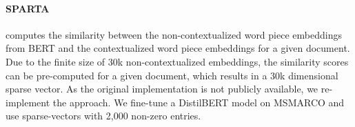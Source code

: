 \documentclass[11pt]{article}
\newcommand{\ra}[1]{\renewcommand{\arraystretch}{#1}}
\begin{document}
\paragraph{\textbf{SPARTA}} \cite{zhao2020sparta} computes the similarity between the non-contextualized word piece embeddings from BERT and the contextualized word piece embeddings for a given document. Due to the finite size of 30k non-contextualized embeddings, the similarity scores can be pre-computed for a given document, which results in a 30k dimensional sparse vector. As the original implementation is not publicly available, we re-implement the approach. We fine-tune a DistilBERT \cite{sanh2020distilbert} model on MSMARCO \cite{nguyen2016ms} and use sparse-vectors with 2,000 non-zero entries. 


\begin{table*}[t!]
    \small
    \ra{1.05}
\end{table*}
\end{document}
